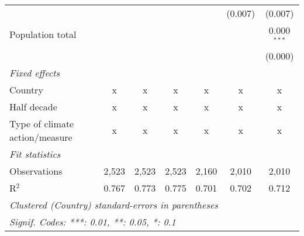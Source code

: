 \begin{tabular}{lcccccc}
                                                                                     &         &               &               &               & (0.007)       & (0.007)\\   
   Population total                                                                  &         &               &               &               &               & 0.000$^{***}$\\   
                                                                                     &         &               &               &               &               & (0.000)\\   
   \emph{Fixed effects}\\
   Country                                                                           & x       & x             & x             & x             & x             & x\\  
   Half decade                                                                       & x       & x             & x             & x             & x             & x\\  
   Type of climate action/measure                                                    & x       & x             & x             & x             & x             & x\\  
   \midrule \emph{Fit statistics}\\
   Observations                                                                      & 2,523   & 2,523         & 2,523         & 2,160         & 2,010         & 2,010\\  
   R$^2$                                                                             & 0.767   & 0.773         & 0.775         & 0.701         & 0.702         & 0.712\\  
   \midrule
   \multicolumn{7}{l}{\emph{Clustered (Country) standard-errors in parentheses}}\\
   \multicolumn{7}{l}{\emph{Signif. Codes: ***: 0.01, **: 0.05, *: 0.1}}\\
\end{tabular}
\par\endgroup


